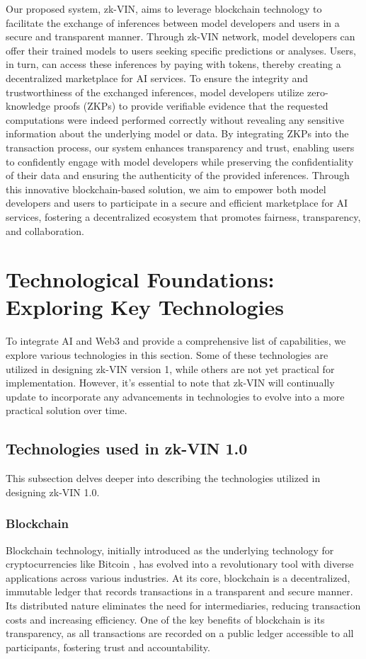 \documentclass[conference]{IEEEtran}
\begin{document}
Our proposed system, zk-VIN, aims to leverage blockchain technology to facilitate the exchange of inferences between model developers and users in a secure and transparent manner. Through zk-VIN network, model developers can offer their trained models to users seeking specific predictions or analyses. Users, in turn, can access these inferences by paying with tokens, thereby creating a decentralized marketplace for AI services. To ensure the integrity and trustworthiness of the exchanged inferences, model developers utilize zero-knowledge proofs (ZKPs) to provide verifiable evidence that the requested computations were indeed performed correctly without revealing any sensitive information about the underlying model or data. By integrating ZKPs into the transaction process, our system enhances transparency and trust, enabling users to confidently engage with model developers while preserving the confidentiality of their data and ensuring the authenticity of the provided inferences. Through this innovative blockchain-based solution, we aim to empower both model developers and users to participate in a secure and efficient marketplace for AI services, fostering a decentralized ecosystem that promotes fairness, transparency, and collaboration.

\section{Technological Foundations: Exploring Key Technologies}
To integrate AI and Web3 and provide a comprehensive list of capabilities, we explore various technologies in this section. Some of these technologies are utilized in designing zk-VIN version 1, while others are not yet practical for implementation. However, it's essential to note that zk-VIN will continually update to incorporate any advancements in technologies to evolve into a more practical solution over time.

\subsection{Technologies used in zk-VIN 1.0}

This subsection delves deeper into describing the technologies utilized in designing zk-VIN 1.0.

\subsubsection{Blockchain}
Blockchain technology, initially introduced as the underlying technology for cryptocurrencies like Bitcoin , has evolved into a revolutionary tool with diverse applications across various industries. At its core, blockchain is a decentralized, immutable ledger that records transactions in a transparent and secure manner. Its distributed nature eliminates the need for intermediaries, reducing transaction costs and increasing efficiency. One of the key benefits of blockchain is its transparency, as all transactions are recorded on a public ledger accessible to all participants, fostering trust and accountability.
\end{document}
